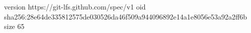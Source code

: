 version https://git-lfs.github.com/spec/v1
oid sha256:28e64de335812575de030526da46f509a944096892e14a1e8056e53a92a2ff6b
size 65
